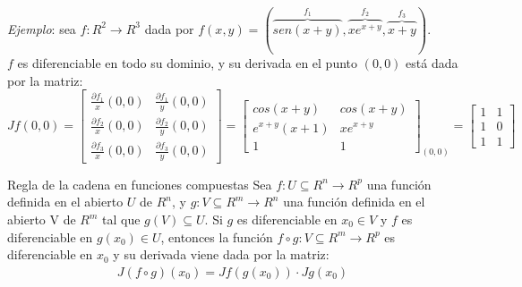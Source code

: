\documentclass[a4paper, twoside]{article}
\numberwithin{equation}{section}
\numberwithin{figure}{section}
\numberwithin{table}{section}
\begin{document}
\textit{Ejemplo}: sea $f: R^2 \to R^3$ dada por $f(x,y)=(\overbrace{sen\left(x+y\right)}^{f_1},\overbrace{xe^{x+y}}^{f_2},\overbrace{x+y}^{f_3})$.\\

$f$ es diferenciable en todo su dominio, y su derivada en el punto	$(0,0)$ está dada por la matriz:\\

$Jf(0,0)=\left[
	\begin{array}{cc}
		\frac{\partial f_{1}}{x}\left(0,0\right) & \frac{\partial f_{1}}{y}\left(0,0\right)\\
		\frac{\partial f_{2}}{x}\left(0,0\right) & \frac{\partial f_{2}}{y}\left(0,0\right)\\
		\frac{\partial f_{3}}{x}\left(0,0\right) & \frac{\partial f_{3}}{y}\left(0,0\right)
	\end{array}\right]=\left[
	\begin{array}{cc}
		cos\left(x+y\right) & cos\left(x+y\right)\\
		e^{x+y}\left(x+1\right) & xe^{x+y}\\
		1 & 1
	\end{array}\right]_{(0,0)}=\left[
	\begin{array}{cc}
		1 & 1\\
		1 & 0\\
		1 & 1
	\end{array}\right]$

\vspace{0.5cm}

\begin{teorema*}{Regla de la cadena en funciones compuestas}
	Sea $f:U\subseteq R^n \to R^p$ una función definida en el abierto $U$ de $R^n$, y $g:V\subseteq R^m \to R^n$ una función definida en el abierto V de $R^m$ tal que $g(V)\subseteq U.$ Si $g$ es diferenciable en $x_0\in V$ y $f$ es diferenciable en $g(x_0)\in U$, entonces la función $f\circ g:V\subseteq R^m \to R^p$ es diferenciable en $x_0$ y su derivada viene dada por la matriz:
	\begin{align}
		J(f\circ g)(x_0)=Jf(g(x_0))\cdot Jg(x_0)
	\end{align}
\end{teorema*}
\end{document}
